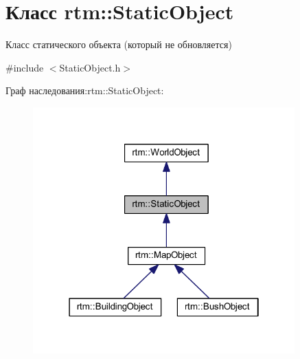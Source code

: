\hypertarget{classrtm_1_1_static_object}{}\section{Класс rtm\+:\+:Static\+Object}
\label{classrtm_1_1_static_object}


Класс статического объекта (который не обновляется)  




{\ttfamily \#include $<$Static\+Object.\+h$>$}



Граф наследования\+:rtm\+:\+:Static\+Object\+:
\nopagebreak
\begin{figure}[H]
\begin{center}
\leavevmode
\includegraphics[width=286pt]{classrtm_1_1_static_object__inherit__graph}
\end{center}
\end{figure}
